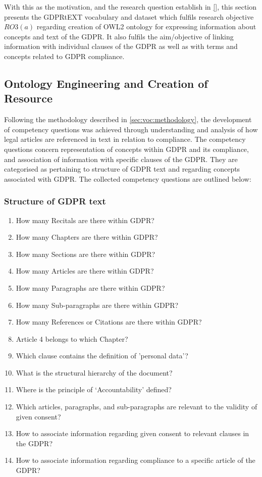 With this as the motivation, and the research question establish in \autoref{}, this section presents the GDPRtEXT vocabulary and dataset which fulfils research objective $RO3(a)$ regarding creation of OWL2 ontology for expressing information about concepts and text of the GDPR. It also fulfils the aim/objective of linking information with individual clauses of the GDPR as well as with terms and concepts related to GDPR compliance.

\subsection{Ontology Engineering and Creation of Resource}\label{sec:voc:gdprtext-engineering}
Following the methodology described in \autoref{sec:voc:methodology}, the development of competency questions was achieved through understanding and analysis of how legal articles are referenced in text in relation to compliance. The competency questions concern representation of concepts within GDPR and its compliance, and association of information with specific clauses of the GDPR. They are categorised as pertaining to structure of GDPR text and regarding concepts associated with GDPR. The collected competency questions are outlined below:

\subsubsection{Structure of GDPR text}
\begin{enumerate}[label={\textit{CQ.\theenumi}}]
    \item How many Recitals are there within GDPR?
    \item How many Chapters are there within GDPR?
    \item How many Sections are there within GDPR?
    \item How many Articles are there within GDPR?
    \item How many Paragraphs are there within GDPR?
    \item How many Sub-paragraphs are there within GDPR?
    \item How many References or Citations are there within GDPR?
    \item Article 4 belongs to which Chapter?
    \item Which clause contains the definition of 'personal data'?
    \item What is the structural hierarchy of the document?
    \item Where is the principle of `Accountability' defined?
    \item Which articles, paragraphs, and sub-paragraphs are relevant to the validity of given consent?
    \item How to associate information regarding given consent to relevant clauses in the GDPR?
    \item How to associate information regarding compliance to a specific article of the GDPR?
\end{enumerate}

